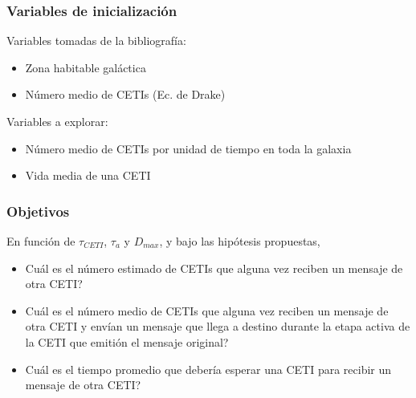 \documentclass[handout]{beamer}
\theoremstyle{plain}
\theoremstyle{definition}
\theoremstyle{remark}
\begin{document}
 
\begin{frame}\frametitle{Variables de inicialización}


   Variables tomadas de la bibliografía:

   \begin{itemize}
      \item Zona habitable galáctica
      \item Número medio de CETIs (Ec. de Drake)
   \end{itemize}

   \vspace{1cm}

   Variables a explorar:

    \begin{itemize}
      \item Número medio de CETIs por unidad de tiempo en toda la
         galaxia
      \item Vida media de una CETI
   \end{itemize}
 

\end{frame}
                         
\begin{frame}\frametitle{Objetivos}

   En función de $\tau_{CETI}$, $\tau_{a}$ y $D_{max}$, y bajo las
   hipótesis propuestas,

   \begin{itemize}
      \item Cuál es el número estimado de CETIs que alguna vez reciben un
         mensaje de otra CETI?
      \item Cuál es el número medio de CETIs que alguna vez reciben un
         mensaje de otra CETI y envían un mensaje que llega a destino
         durante la etapa activa de la CETI que emitión el mensaje
         original?
      \item Cuál es el tiempo promedio que debería esperar una CETI
         para recibir un mensaje de otra CETI?
   \end{itemize}

\end{frame}
                
\end{document}
